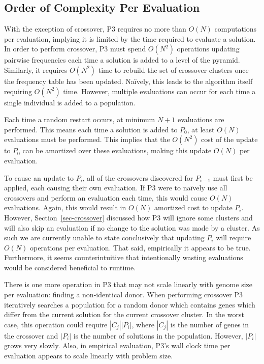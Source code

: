 \documentclass{sig-alternate}
\begin{document}
\subsection{Order of Complexity Per Evaluation}
With the exception of crossover, P3 requires no more than $O(N)$ computations
per evaluation, implying it is limited by the time required to evaluate a solution.
In order to perform crossover, P3 must spend $O(N^2)$ operations updating pairwise
frequencies each time a solution is added to a level of the pyramid.  Similarly,
it requires $O(N^2)$ time to rebuild the set of crossover clusters once the frequency
table has been updated.  Na\"ively, this leads to the algorithm itself requiring $O(N^2)$ time.
However, multiple evaluations can occur for each time a single individual is added
to a population.

Each time a random restart occurs, at minimum $N+1$ evaluations are performed.
This means each time a solution is added to $P_0$, at least $O(N)$ evaluations
must be performed.  This implies that the $O(N^2)$ cost of the update to $P_0$ can
be amortized over these evaluations, making this update $O(N)$ per evaluation.

To cause an update to $P_i$, all of the crossovers discovered for
$P_{i-1}$ must first be applied, each causing their own evaluation.
If P3 were to na\"ively use all crossovers and perform an evaluation
each time, this would cause $O(N)$ evaluations.  Again, this would
result in $O(N)$ amortized cost to update $P_i$.  However,
Section~\ref{sec-crossover} discussed how P3 will ignore some clusters
and will also skip an evaluation if no change to the solution was made
by a cluster.  As such we are currently unable to state conclusively
that updating $P_i$ will require $O(N)$ operations per evaluation.  That said,
empirically it appears to be true.  Furthermore, it seems counterintuitive
that intentionally wasting evaluations would be considered beneficial
to runtime.

There is one more operation in P3 that may not scale linearly with
genome size per evaluation: finding a non-identical donor.  When
performing crossover P3 iteratively searches a population for a random
donor which contains genes which differ from the current solution for
the current crossover cluster.  In the worst case, this operation
could require $|C_j||P_i|$, where $|C_j|$ is the number of genes in
the crossover and $|P_i|$ is the number of solutions in the
population.  However, $|P_i|$ grows very slowly.  Also, in empirical
evaluation, P3's wall clock time per evaluation appears to scale
linearly with problem size.
\end{document}

